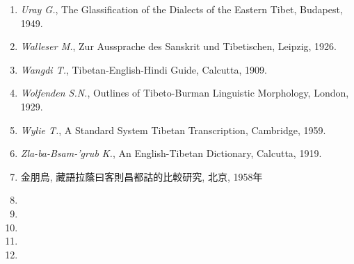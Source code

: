 \begin{enumerate}
	\item \emph{Uray G.}, The Glassification of the Dialects of the Eastern Tibet, Budapest, 1949.
	\item \emph{Walleser M.}, Zur Aussprache des Sanskrit und Tibetischen, Leipzig, 1926.
	\item \emph{Wangdi T.}, Tibetan-English-Hindi Guide, Calcutta, 1909.
	\item \emph{Wolfenden S.N.}, Outlines of Tibeto-Burman Linguistic Morphology, London, 1929.
	\item \emph{Wylie T.}, A Standard System Tibetan Transcription, Cambridge, 1959.
	\item \emph{Zla-ba-Bsam-'grub K.}, An English-Tibetan Dictionary, Calcutta, 1919.
	\item {\chinfont 金朋烏, 藏語拉蔭曰客則昌都詁的比較研究, 北京, 1958年}
	\item {}
	\item {}
	\item {}
	\item {}
	\item {}
\end{enumerate}
